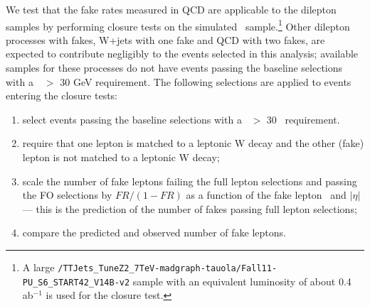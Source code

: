 We test that the fake rates measured in QCD are applicable to the dilepton samples by performing closure
tests on the simulated \ttbar\ sample.\footnote{A large {\tt /TTJets\_TuneZ2\_7TeV-madgraph-tauola/Fall11-PU\_S6\_START42\_V14B-v2} 
sample with an equivalent luminosity of about 0.4 ab$^{-1}$ is used for the closure test.}
Other dilepton processes with fakes, W+jets with one fake and QCD with two fakes, are expected
to contribute negligibly to the events selected in this analysis;
available samples for these processes do not have events passing the baseline selections with a~\met~$>$ 30 GeV requirement.
The following selections are applied to events entering the closure tests:
\begin{enumerate}
\item select events passing the baseline selections with a \met~$>$ 30 \GeV~requirement.
\item require that one lepton is matched to a leptonic W decay and the other (fake) lepton is not
matched to a leptonic W decay;
\item scale the number of fake leptons failing the full lepton selections and passing the FO selections
	by $FR/(1-FR)$ as a function of the fake lepton \pt\ and $|\eta|$ --- this is the prediction
	of the number of fakes passing full lepton selections;
\item compare the predicted and observed number of fake leptons.
\end{enumerate}



